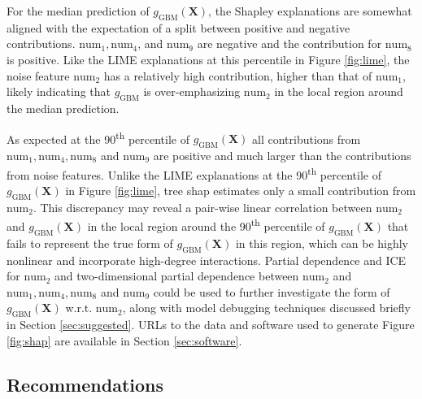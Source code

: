 \documentclass[11pt]{asaproc}
\begin{document}
For the median prediction of $g_{\text{GBM}}(\mathbf{X})$, the Shapley explanations are somewhat aligned with the expectation of a split between positive and negative contributions. $\text{num}_1, \text{num}_4$, and $\text{num}_9$ are negative and the contribution for $\text{num}_8$ is positive. Like the LIME explanations at this percentile in Figure \ref{fig:lime}, the noise feature $\text{num}_2$ has a relatively high contribution, higher than that of $\text{num}_1$, likely indicating that $g_{\text{GBM}}$ is over-emphasizing $\text{num}_2$ in the local region around the median prediction. 

As expected at the 90\textsuperscript{th} percentile of $g_{\text{GBM}}(\mathbf{X})$ all contributions from $\text{num}_1, \text{num}_4, \text{num}_8$ and $\text{num}_9$ are positive and much larger than the contributions from noise features. Unlike the LIME explanations at the 90\textsuperscript{th} percentile of $g_{\text{GBM}}(\mathbf{X})$ in Figure \ref{fig:lime}, tree shap estimates only a small contribution from $\text{num}_2$. This discrepancy may reveal a pair-wise linear correlation between $\text{num}_2$ and $g_{\text{GBM}}(\mathbf{X})$ in the local region around the 90\textsuperscript{th} percentile of $g_{\text{GBM}}(\mathbf{X})$ that fails to represent the true form of $g_{\text{GBM}}(\mathbf{X})$ in this region, which can be highly nonlinear and incorporate high-degree interactions. Partial dependence and ICE for $\text{num}_2$ and two-dimensional partial dependence between $\text{num}_2$ and $\text{num}_1, \text{num}_4, \text{num}_8$ and $\text{num}_9$ could be used to further investigate the form of $g_{\text{GBM}}(\mathbf{X})$ w.r.t. $\text{num}_2$, along with model debugging techniques discussed briefly in Section \ref{sec:suggested}. URLs to the data and software used to generate Figure \ref{fig:shap} are available in Section \ref{sec:software}.

\subsection{Recommendations}
\end{document}
